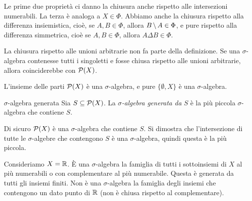 \documentclass[a4paper]{article}
\begin{document}
\begin{radioactive}
Le prime due proprietà ci danno la chiusura anche rispetto alle intersezioni numerabili.
La terza è analoga a \(X \in \Phi\).
Abbiamo anche la chiusura rispetto alla differenza insiemistica,
cioè, se \(A,B \in \Phi\), allora \(B \,\backslash\, A \in \Phi\),
e pure rispetto alla differenza simmetrica, cioè se \(A, B \in \Phi\),
allora \(A \Delta B \in \Phi\).

La chiusura rispetto alle unioni arbitrarie non fa parte della definizione. Se
una \(\sigma\)-algebra contenesse tutti i singoletti e fosse chiusa rispetto alle
unioni arbitrarie, allora coinciderebbe con \(\mathcal P(X)\).
\end{radioactive}

\begin{radioactive}
\begin{snippetexample}{}
    L'insieme delle parti \(\mathcal P(X)\) è una \(\sigma\)-algebra,
    e pure \(\{\emptyset, X\}\) è una \(\sigma\)-algebra.
\end{snippetexample}
\end{radioactive}

\begin{radioactive}
\begin{snippetdefinition}{\(\sigma\)-algebra generata}
    Sia \(S \subseteq \mathcal P(X)\).
    La \emph{\(\sigma\)-algebra generata da \(S\)}
    è la più piccola \(\sigma\)-algebra che contiene \(S\).
\end{snippetdefinition}
\end{radioactive}

\begin{radioactive}
Di sicuro \(\mathcal P(X)\) è una \(\sigma\)-algebra
che contiene \(S\). Si dimostra che l'intersezione di tutte le \(\sigma\)-algebre
che contengono \(S\) è una \(\sigma\)-algebra, quindi questa è la più piccola.
\end{radioactive}

\begin{radioactive}
\begin{snippetexample}{}
    Consideriamo \(X=\mathbb{R}\). È una \(\sigma\)-algebra
    la famiglia di tutti i sottoinsiemi di \(X\)
    al più numerabili o con complementare al più numerabile.
    Questa è generata da tutti gli insiemi finiti.
    Non è una \(\sigma\)-algebra la famiglia
    degli insiemi che contengono un dato punto di \(\mathbb{R}\)
    (non è chiusa rispetto al complementare).
\end{snippetexample}
\end{radioactive}
\end{document}
